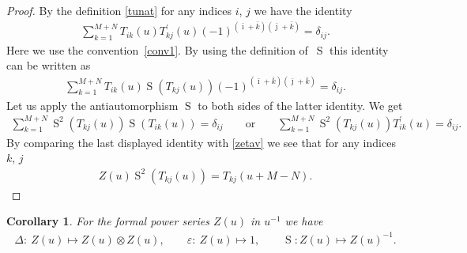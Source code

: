 \documentclass[10pt,a4paper]{amsart}
\numberwithin{equation}{section}
\newtheorem{Corollary}[Theorem]{Corollary}
\def\bi{{\bar\imath }}
\def\bj{{\bar\jmath }}
\def\bk{{\bar k }}
\def\De{\Delta}
\def\ep{\varepsilon}
\def\ot{\otimes}
\def\S{\operatorname{S}}
\def\TP{T^{\prime}}
\begin{document}
\begin{proof}By the definition \eqref{tunat} for any indices $i$, $j$
we have the identity
\begin{gather}\label{TTP}
\sum_{k=1}^{M+N} T_{ik}(u) \TP_{kj}(u)
{(-1)}^{( \bi + \bk )( \bj + \bk )}
=\delta_{ij} .
\end{gather}
Here we use the convention~\eqref{conv1}. By using the definition of~$\S$
this identity can be written as
\begin{gather*}
\sum_{k=1}^{M+N} T_{ik}(u) \S( T_{kj}(u))
{(-1)}^{( \bi + \bk )( \bj + \bk )}
=\delta_{ij} .
\end{gather*}
Let us apply the antiautomorphism $\S$ to both sides of
the latter identity. We get
\begin{gather*}
\sum_{k=1}^{M+N}
\S^{2}( T_{kj}(u)) \S( T_{ik}(u))=\delta_{ij}
\qquad\text{or}\qquad
\sum_{k=1}^{M+N}
\S^{2}( T_{kj}(u)) \TP_{ik}(u)=\delta_{ij} .
\end{gather*}
By comparing the last displayed identity with \eqref{zetav} we see that
for any indices $k$, $j$
\begin{gather*}
Z(u) \S^{2}( T_{kj}(u))=T_{kj}(u+M-N) .
\tag*{\qed}
\end{gather*}
\renewcommand{\qed}{}
\end{proof}

\begin{Corollary}
\label{DZ}
For the formal power series $Z(u)$ in $u^{-1}$ we have
\begin{gather}
\label{DeZu}
\De\colon \ Z(u)\mapsto Z(u)\ot Z(u) ,
\qquad
\ep\colon \ Z(u)\mapsto1 ,
\qquad
\S\colon Z(u)\mapsto Z(u)^{-1} .
\end{gather}
\end{Corollary}
\end{document}
